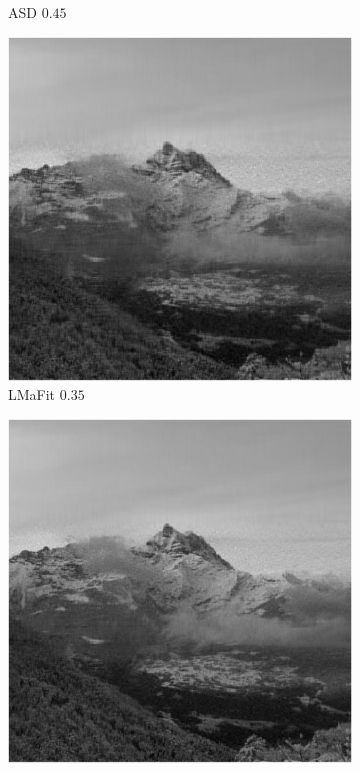 \begin{figure}[!ht]
\begin{subfigure}{0.325\linewidth}
        \caption{ASD $0.45$}
    \end{subfigure}
    \begin{subfigure}{0.325\linewidth}
        \hfill
    \end{subfigure}
    \begin{subfigure}{0.325\linewidth}
        \includegraphics[width=\linewidth]{Poglavja/Slike/grayscale1000/slikaRez35LmaFIT50.png}
        \caption{LMaFit $0.35$}
    \end{subfigure}
    \hfill
    \begin{subfigure}{0.325\linewidth}
        \includegraphics[width=\linewidth]{Poglavja/Slike/grayscale1000/slikaRez45LmaFIT73.png}

\end{subfigure}
\end{figure}
